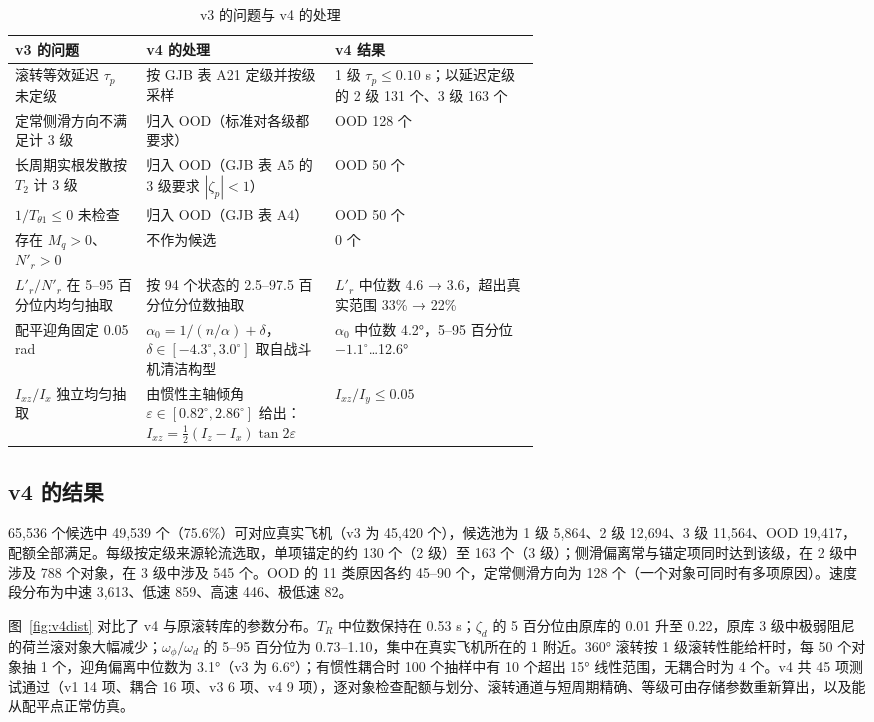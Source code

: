 \documentclass[UTF8,a4paper,11pt,fontset=fandol,scheme=plain]{ctexart}
\begin{document}
\begin{table}[H]
\centering\small
\caption{v3 的问题与 v4 的处理}\label{tab:v4fix}
\begin{tabularx}{\linewidth}{@{}>{\raggedright\arraybackslash}p{0.25\linewidth}>{\raggedright\arraybackslash}p{0.36\linewidth}Y@{}}
\toprule
v3 的问题 & v4 的处理 & v4 结果 \\
\midrule
滚转等效延迟 \(\tau_p\) 未定级 & 按 GJB 表 A21 定级并按级采样 & 1 级 \(\tau_p\le0.10\) s；以延迟定级的 2 级 131 个、3 级 163 个 \\
定常侧滑方向不满足计 3 级 & 归入 OOD（标准对各级都要求） & OOD 128 个 \\
长周期实根发散按 \(T_2\) 计 3 级 & 归入 OOD（GJB 表 A5 的 3 级要求 \(|\zeta_p|<1\)） & OOD 50 个 \\
\(1/T_{\theta1}\le0\) 未检查 & 归入 OOD（GJB 表 A4） & OOD 50 个 \\
存在 \(M_q>0\)、\(N'_r>0\) & 不作为候选 & 0 个 \\
\(L'_r/N'_r\) 在 5–95 百分位内均匀抽取 & 按 94 个状态的 2.5–97.5 百分位分位数抽取 & \(L'_r\) 中位数 4.6 → 3.6，超出真实范围 33\% → 22\% \\
配平迎角固定 0.05 rad & \(\alpha_0=1/(n/\alpha)+\delta\)，\(\delta\in[-4.3^\circ,3.0^\circ]\) 取自战斗机清洁构型 & \(\alpha_0\) 中位数 4.2°，5–95 百分位 \(-1.1^\circ\)…12.6° \\
\(I_{xz}/I_x\) 独立均匀抽取 & 由惯性主轴倾角 \(\varepsilon\in[0.82^\circ,2.86^\circ]\) 给出：\(I_{xz}=\tfrac12(I_z-I_x)\tan2\varepsilon\) & \(I_{xz}/I_y\le0.05\) \\
\bottomrule
\end{tabularx}
\end{table}

\subsection{v4 的结果}
65,536 个候选中 49,539 个（75.6\%）可对应真实飞机（v3 为 45,420 个），候选池为 1 级 5,864、2 级 12,694、3 级 11,564、OOD 19,417，配额全部满足。每级按定级来源轮流选取，单项锚定的约 130 个（2 级）至 163 个（3 级）；侧滑偏离常与锚定项同时达到该级，在 2 级中涉及 788 个对象，在 3 级中涉及 545 个。OOD 的 11 类原因各约 45–90 个，定常侧滑方向为 128 个（一个对象可同时有多项原因）。速度段分布为中速 3,613、低速 859、高速 446、极低速 82。

图~\ref{fig:v4dist} 对比了 v4 与原滚转库的参数分布。\(T_R\) 中位数保持在 0.53 s；\(\zeta_d\) 的 5 百分位由原库的 0.01 升至 0.22，原库 3 级中极弱阻尼的荷兰滚对象大幅减少；\(\omega_\phi/\omega_d\) 的 5–95 百分位为 0.73–1.10，集中在真实飞机所在的 1 附近。360° 滚转按 1 级滚转性能给杆时，每 50 个对象抽 1 个，迎角偏离中位数为 3.1°（v3 为 6.6°）；有惯性耦合时 100 个抽样中有 10 个超出 15° 线性范围，无耦合时为 4 个。v4 共 45 项测试通过（v1 14 项、耦合 16 项、v3 6 项、v4 9 项），逐对象检查配额与划分、滚转通道与短周期精确、等级可由存储参数重新算出，以及能从配平点正常仿真。
\end{document}
